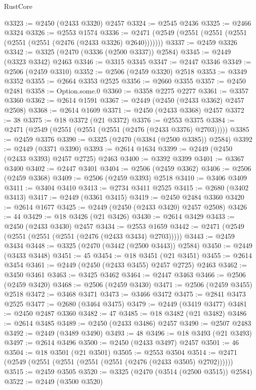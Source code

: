 \begin{lexlean}{RustCore}
\begin{coremodule}
@3323 := @2450 (@2433 @3320) @2457
@3324 := @2545 @2436
@3325 := @2466 @3324
@3326 := @2553 @1574
@3336 := @2471 (@2549 (@2551 (@2551 (@2551 (@2551 (@2551 (@2476 (@2433 @3326) @2640)))))))
@3337 := @2459 @3326
@3342 := @3325 (@2470 (@3336 (@2500 @3337)) @2584)
@3345 := @2449 (@3323 @3342) @2463
@3346 := @3315 @3345
@3347 := @2447 @3346
@3349 := @2506 (@2459 @3310)
@3352 := @2506 (@2459 @3320) @2518
@3353 := @3349 @3352
@3355 := @2664 @3353 @2525
@3356 := @2660 @3355
@3357 := @2450 @2481
@3358 := Option.some.{0}
@3360 := @3358 @2275 @2277
@3361 := @3357 @3360
@3362 := @2614 @1591
@3367 := @2449 (@2450 (@2433 @3362) @2457 @2508)
@3368 := @2614 @1609
@3371 := @2450 (@2433 @3368) @2457
@3372 := 38
@3375 := @18 @3372 (@21 @3372)
@3376 := @2553 @3375
@3384 := @2471 (@2549 (@2551 (@2551 (@2551 (@2476 (@2433 @3376) @2703)))))
@3385 := @2459 @3376
@3390 := @3325 (@2470 (@3384 (@2500 @3385)) @2584)
@3392 := @2449 (@3371 @3390)
@3393 := @2614 @1634
@3399 := @2449 (@2450 (@2433 @3393) @2457 @2725) @2463
@3400 := @3392 @3399
@3401 := @3367 @3400
@3402 := @2447 @3401
@3404 := @2506 (@2459 @3362)
@3406 := @2506 (@2459 @3368)
@3409 := @2506 (@2459 @3393) @2518
@3410 := @3406 @3409
@3411 := @3404 @3410
@3413 := @2734 @3411 @2525
@3415 := @2680 (@3402 @3413)
@3417 := @2449 (@3361 @3415)
@3419 := @2450 @2484 @3360
@3420 := @2614 @1677
@3425 := @2449 (@2450 (@2433 @3420) @2457 @2508)
@3426 := 44
@3429 := @18 @3426 (@21 @3426)
@3430 := @2614 @3429
@3433 := @2450 (@2433 @3430) @2457
@3434 := @2553 @1659
@3442 := @2471 (@2549 (@2551 (@2551 (@2551 (@2476 (@2433 @3434) @2703)))))
@3443 := @2459 @3434
@3448 := @3325 (@2470 (@3442 (@2500 @3443)) @2584)
@3450 := @2449 (@3433 @3448)
@3451 := 45
@3454 := @18 @3451 (@21 @3451)
@3455 := @2614 @3454
@3461 := @2449 (@2450 (@2433 @3455) @2457 @2725) @2463
@3462 := @3450 @3461
@3463 := @3425 @3462
@3464 := @2447 @3463
@3466 := @2506 (@2459 @3420)
@3468 := @2506 (@2459 @3430)
@3471 := @2506 (@2459 @3455) @2518
@3472 := @3468 @3471
@3473 := @3466 @3472
@3475 := @2841 @3473 @2525
@3477 := @2680 (@3464 @3475)
@3479 := @2449 (@3419 @3477)
@3481 := @2450 @2487 @3360
@3482 := 47
@3485 := @18 @3482 (@21 @3482)
@3486 := @2614 @3485
@3489 := @2450 (@2433 @3486) @2457
@3490 := @2507 @2483
@3492 := @2449 (@3489 @3490)
@3493 := 48
@3496 := @18 @3493 (@21 @3493)
@3497 := @2614 @3496
@3500 := @2450 (@2433 @3497) @2457
@3501 := 46
@3504 := @18 @3501 (@21 @3501)
@3505 := @2553 @3504
@3514 := @2471 (@2549 (@2551 (@2551 (@2551 (@2551 (@2476 (@2433 @3505) @2702))))))
@3515 := @2459 @3505
@3520 := @3325 (@2470 (@3514 (@2500 @3515)) @2584)
@3522 := @2449 (@3500 @3520)

\end{coremodule}
\end{lexlean}
